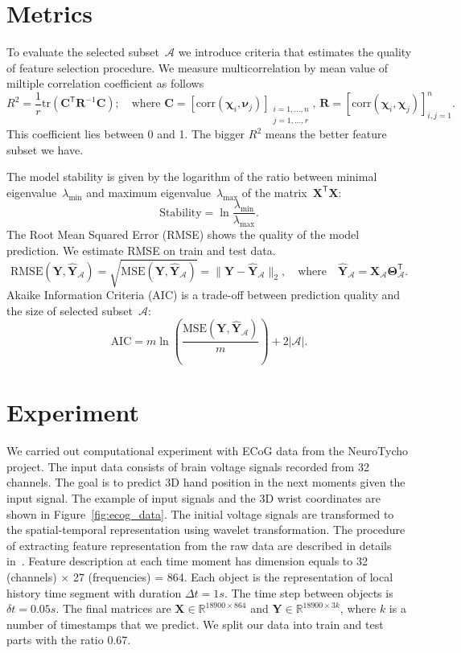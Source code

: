 \documentclass[12pt,twoside]{article}
\theoremstyle{definition}
\newcommand{\bY}{\mathbf{Y}}
\newcommand{\bX}{\mathbf{X}}
\newcommand{\bC}{\mathbf{C}}
\newcommand{\bbR}{\mathbb{R}}
\newcommand{\cA}{\mathcal{A}}
\newcommand{\T}{\mathsf{T}}
\newcommand{\bchi}{\boldsymbol{\chi}}
\newcommand{\bnu}{\boldsymbol{\nu}}
\newcommand{\bTheta}{\boldsymbol{\Theta}}
\begin{document}
\section{Metrics}

To evaluate the selected subset~$\cA$ we introduce criteria that estimates the quality of feature selection procedure.
We measure multicorrelation by mean value of miltiple correlation coefficient as follows
\[
	R^2 = \frac{1}{r} \text{tr} \left( \bC^{\T} \mathbf{R}^{-1} \bC \right); \quad \text{where }\bC = [ \text{corr}(\bchi_i, \bnu_j)]_{\substack{i=1, \dots, n \\ j=1, \dots, r}}, \, \mathbf{R} = [ \text{corr}(\bchi_i, \bchi_j)]_{i, j = 1}^n.
\]
This coefficient lies between 0 and 1. The bigger $R^2$ means the better feature subset we have.

The model stability is given by the logarithm of the ratio between minimal eigenvalue~$\lambda_{\min}$ and maximum eigenvalue~$\lambda_{\max}$ of the matrix~$\bX^{\T} \bX$:
\[
	\text{Stability} = \ln \frac{\lambda_{\min}}{\lambda_{\max}}.
\]
The Root Mean Squared Error (RMSE) shows the quality of the model prediction. We estimate RMSE on train and test data.
\[
	\text{RMSE}(\bY, \widehat{\bY}_{\cA}) = \sqrt{\text{MSE} (\bY, \widehat{\bY}_{\cA})} =  \| \bY - \widehat{\bY}_{\cA} \|_2, \quad \text{where} \quad \widehat{\bY}_{\cA} = \bX_{\cA} \bTheta_{\cA}^{\T}.
\]
Akaike Information Criteria (AIC) is a trade-off between prediction quality and the size of selected subset~$\cA$:
\[
	\text{AIC} = m \ln \left( \frac{\text{MSE} ( \bY, \widehat{\bY}_{\cA})}{m}\right) + 2 | \cA |.
\]

\section{Experiment}
We carried out computational experiment with ECoG data from the NeuroTycho project. The input data consists of brain voltage signals recorded from 32 channels.
The goal is to predict 3D hand position in the next moments given the input signal.
The example of input signals and the 3D wrist coordinates are shown in Figure~\ref{fig:ecog_data}.
The initial voltage signals are transformed to the spatial-temporal representation using wavelet transformation.
The procedure of extracting feature representation from the raw data are described in details in~\cite{chao2010long,eliseyev2016penalized}.
Feature description at each time moment has dimension equals to 32 (channels) $\times$ 27 (frequencies) = 864.
Each object is the representation of local history time segment with duration $\Delta t = 1s$. The time step between objects is $\delta t =  0.05s$.
The final matrices are $\bX \in \bbR^{18900 \times 864}$ and $\bY \in \bbR^{18900 \times 3k}$, where $k$ is a number of timestamps that we predict.
We split our data into train and test parts with the ratio 0.67.
\end{document}
